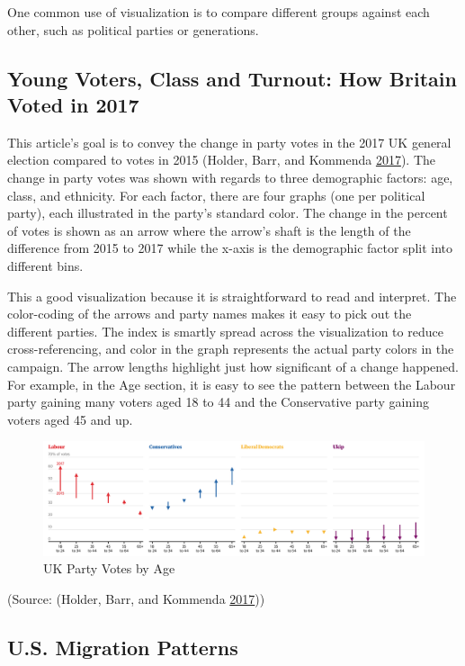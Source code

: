 \documentclass[]{book}
\theoremstyle{definition}
\theoremstyle{definition}
\theoremstyle{definition}
\theoremstyle{remark}
\begin{document}
One common use of visualization is to compare different groups against
each other, such as political parties or generations.

\subsection{Young Voters, Class and Turnout: How Britain Voted in
2017}\label{young-voters-class-and-turnout-how-britain-voted-in-2017}

This article's goal is to convey the change in party votes in the 2017
UK general election compared to votes in 2015 (Holder, Barr, and
Kommenda \protect\hyperlink{ref-UKvotes2017}{2017}). The change in party
votes was shown with regards to three demographic factors: age, class,
and ethnicity. For each factor, there are four graphs (one per political
party), each illustrated in the party's standard color. The change in
the percent of votes is shown as an arrow where the arrow's shaft is the
length of the difference from 2015 to 2017 while the x-axis is the
demographic factor split into different bins.

This a good visualization because it is straightforward to read and
interpret. The color-coding of the arrows and party names makes it easy
to pick out the different parties. The index is smartly spread across
the visualization to reduce cross-referencing, and color in the graph
represents the actual party colors in the campaign. The arrow lengths
highlight just how significant of a change happened. For example, in the
Age section, it is easy to see the pattern between the Labour party
gaining many voters aged 18 to 44 and the Conservative party gaining
voters aged 45 and up.

\begin{figure}
\centering
\includegraphics{images/Party_Votes_by_Age.png}
\caption{UK Party Votes by Age}
\end{figure}

(Source: (Holder, Barr, and Kommenda
\protect\hyperlink{ref-UKvotes2017}{2017}))

\subsection{U.S. Migration Patterns}\label{u.s.-migration-patterns}
\end{document}
